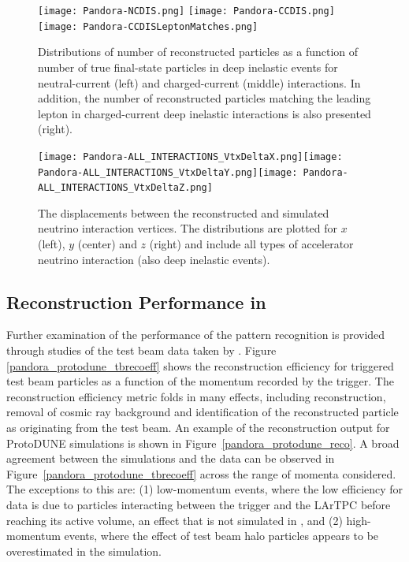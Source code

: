 \begin{figure}[!ht]
\centering
\texttt{[image: Pandora-NCDIS.png]}
\texttt{[image: Pandora-CCDIS.png]}
\texttt{[image: Pandora-CCDISLeptonMatches.png]}
\caption[Number of reconstructed particles per number of true final-state particles,  and ]{Distributions of number of reconstructed particles as a function of number of true final-state particles in deep inelastic events for neutral-current (left) and charged-current (middle) interactions. In addition, the number of reconstructed particles matching the leading lepton in charged-current deep inelastic interactions is also presented (right).}
\label{pandora_dis}
\end{figure}


\begin{figure}[!ht]
\centering
\texttt{[image: Pandora-ALL\_INTERACTIONS\_VtxDeltaX.png]}\texttt{[image: Pandora-ALL\_INTERACTIONS\_VtxDeltaY.png]}\texttt{[image: Pandora-ALL\_INTERACTIONS\_VtxDeltaZ.png]}
\caption[Displacements between reconstructed and simulated $\nu$ interaction vertices]{The displacements between the reconstructed and simulated neutrino interaction vertices. The distributions are plotted for $x$ (left), $y$ (center) and $z$ (right) and include all types of accelerator neutrino interaction (also deep inelastic events).}
\label{pandora_vertex_resolution}
\end{figure}

\subsection{Reconstruction Performance in }
\label{sec:Pandora:ProtoDUNE}

Further examination of the performance of the  pattern recognition is provided through studies of the test beam data taken by .  Figure \ref{pandora_protodune_tbrecoeff} shows the reconstruction efficiency for triggered test beam particles as a function of the momentum recorded by the trigger.  The reconstruction efficiency metric folds in many effects, including reconstruction, removal of cosmic ray background and identification of the reconstructed particle as originating from the test beam.  An example of the  reconstruction output for ProtoDUNE  simulations is shown in Figure~\ref{pandora_protodune_reco}.  A broad agreement between the  simulations and the data can be observed in Figure~\ref{pandora_protodune_tbrecoeff} across the range of momenta considered.  The exceptions to this are: (1) low-momentum events, where the low efficiency for data is due to particles interacting between the trigger and the LArTPC before reaching its active volume, an effect that is not simulated in , and (2) high-momentum events, where the effect of test beam halo particles appears to be overestimated in the simulation.

